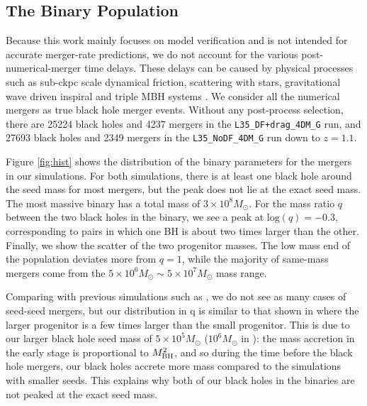 \subsection{The Binary Population}
\label{subsec:L35_catalog}
Because this work mainly focuses on model verification and is not intended for accurate merger-rate predictions, we do not account for the various post-numerical-merger time delays. These delays can be caused by physical processes such as sub-ckpc scale dynamical friction, scattering with stars, gravitational wave driven inspiral and triple MBH systems \citep[e.g.][]{Quinlan1996,Sesana2007b,Vasiliev2015,Dosopoulou2017,Bonetti2018}. We consider all the numerical mergers as true black hole merger events. Without any post-process selection, there are 25224 black holes and 4237 mergers in the \texttt{L35\_DF+drag\_4DM\_G} run, and 27693 black holes and 2349 mergers in the \texttt{L35\_NoDF\_4DM\_G} run down to $z=1.1$.

Figure \ref{fig:hist} shows the distribution of the binary parameters for the mergers in our simulations. For both simulations, there is at least one black hole around the seed mass for most mergers, but the peak does not lie at the exact seed mass. The most massive binary has a total mass of $3\times 10^8 M_\odot$. For the mass ratio $q$ between the two black holes in the binary, we see a peak at $\text{log}(q)=-0.3$, corresponding to pairs in which one BH is about two times larger than the other. Finally, we show the scatter of the two progenitor masses. The low mass end of the population deviates more from $q=1$, while the majority of same-mass mergers come from the $5\times 10^6 M_\odot\sim 5\times 10^7 M_\odot$ mass range.

Comparing with previous simulations such as \cite{Salcido2016,Katz2020}, we do not see as many cases of seed-seed mergers, but our distribution in q is similar to that shown in \cite{Weinberger2017} where the larger progenitor is a few times larger than the small progenitor. This is due to our larger black hole seed mass of $5\times10^5 M_\odot$ ($10^6 M_\odot$ in \cite{Weinberger2017}): the mass accretion in the early stage is proportional to $M_{\rm BH}^2$, and so during the time before the black hole mergers, our black holes accrete more mass compared to the simulations with smaller seeds. This explains why both of our black holes in the binaries are not peaked at the exact seed mass.


